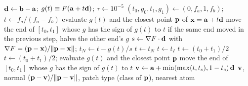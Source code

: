 \begin{algorithm}[t]
  \caption{Vertex of an owned crossing edge $\vect a\vect b$ whose sampled
    values $f_a, f_b$ have opposite signs (\cref{sec:refine}). Each
    evaluation of $F$ is exact, in double precision against the sub-block's
    candidate lists, and also returns the closest point $\vect p$ on the
    SAS with the class of its candidate. The  mode keeps the
    linear estimate.}
  \label{alg:refine}
  \small
  \begin{algorithmic}[1]
      \State $\mathbf{d} \gets \mathbf{b} - \mathbf{a}$;\; $g(t) \equiv F(\mathbf{a} + t\mathbf{d})$;\;
        $\tau \gets 10^{-5}$\Ang
      \State $(t_0, g_0, t_1, g_1) \gets (0, f_a, 1, f_b)$;\; $t \gets f_a/(f_a - f_b)$
       
        \State evaluate $g(t)$ and the closest point $\vect p$ of $\mathbf{x} = \mathbf{a} + t\mathbf{d}$
        \State move the end of $[t_0, t_1]$ whose $g$ has the sign of $g(t)$ to $t$
        \State if the same end moved in the previous step, halve the other end's $g$
        \State $s \gets \nabla F \cdot \mathbf{d}$ with $\nabla F = (\mathbf{p} - \mathbf{x})/\lVert\mathbf{p} - \mathbf{x}\rVert$;\;
          $t_N \gets t - g(t)/s$
          \State $t \gets t_N$ 
          \State $t \gets t_I$ 
        \Else
          \State $t \gets (t_0 + t_1)/2$
        \EndIf
      \EndFor
      \Loop {}
        \State $t \gets (t_0 + t_1)/2$; evaluate $g(t)$ and the closest point $\vect p$
        \State move the end of $[t_0, t_1]$ whose $g$ has the sign of $g(t)$ to $t$
      \EndLoop
    \EndFunction
    \Statex
      \State $\mathbf{v} \gets \mathbf{a} + \min(\max(t, t_c), 1 - t_c)\,\mathbf{d}$
      \State \Return $\mathbf{v}$, normal $(\mathbf{p} - \mathbf{v})/\lVert\mathbf{p} - \mathbf{v}\rVert$,
        patch type (class of $\vect p$), nearest atom
    \EndFunction
  \end{algorithmic}
\end{algorithm}

